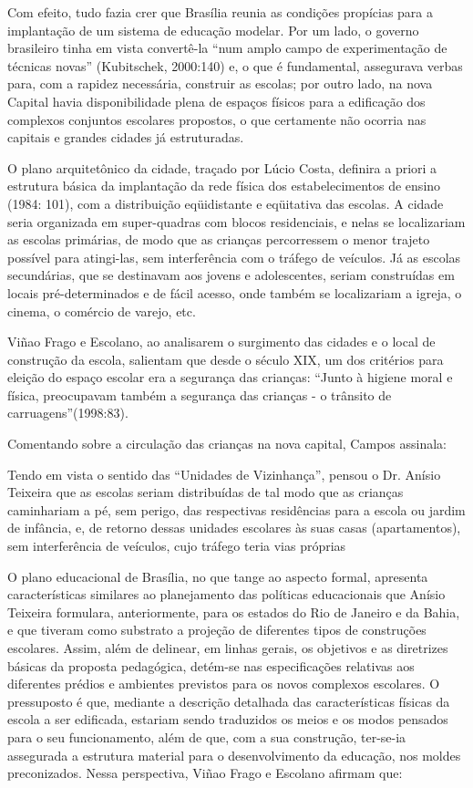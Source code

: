 Com efeito, tudo fazia crer que Brasília reunia as condições propícias para a
implantação de um sistema de educação modelar. Por um lado, o governo brasileiro
tinha em vista convertê-la “num amplo campo de experimentação de técnicas novas”
(Kubitschek, 2000:140) e, o que é fundamental, assegurava verbas para, com a rapidez
necessária, construir as escolas; por outro lado, na nova Capital havia disponibilidade
plena de espaços físicos para a edificação dos complexos conjuntos escolares propostos,
o que certamente não ocorria nas capitais e grandes cidades já estruturadas.

O plano arquitetônico da cidade, traçado por Lúcio Costa, definira a priori a
estrutura básica da implantação da rede física dos estabelecimentos de ensino (1984:
101), com a distribuição eqüidistante e eqüitativa das escolas. A cidade seria organizada
em super-quadras com blocos residenciais, e nelas se localizariam as escolas primárias,
de modo que as crianças percorressem o menor trajeto possível para atingi-las, sem
interferência com o tráfego de veículos. Já as escolas secundárias, que se destinavam
aos jovens e adolescentes, seriam construídas em locais pré-determinados e de fácil
acesso, onde também se localizariam a igreja, o cinema, o comércio de varejo, etc.

Viñao Frago e Escolano, ao analisarem o surgimento das cidades e o local de
construção da escola, salientam que desde o século XIX, um dos critérios para eleição
do espaço escolar era a segurança das crianças: “Junto à higiene moral e física,
preocupavam também a segurança das crianças - o trânsito de carruagens”(1998:83).

Comentando sobre a circulação das crianças na nova capital, Campos assinala:
\begin{citacao}
    Tendo em vista o sentido das “Unidades de Vizinhança”, pensou o Dr.
    Anísio Teixeira que as escolas seriam distribuídas de tal modo que as
    crianças caminhariam a pé, sem perigo, das respectivas residências para a
    escola ou jardim de infância, e, de retorno dessas unidades escolares às suas
    casas (apartamentos), sem interferência de veículos, cujo tráfego teria vias
    próprias
\end{citacao}

O plano educacional de Brasília, no que tange ao aspecto formal, apresenta
características similares ao planejamento das políticas educacionais que Anísio Teixeira
formulara, anteriormente, para os estados do Rio de Janeiro e da Bahia, e que tiveram
como substrato a projeção de diferentes tipos de construções escolares. Assim, além de
delinear, em linhas gerais, os objetivos e as diretrizes básicas da proposta pedagógica,
detém-se nas especificações relativas aos diferentes prédios e ambientes previstos para
os novos complexos escolares. O pressuposto é que, mediante a descrição detalhada das
características físicas da escola a ser edificada, estariam sendo traduzidos os meios e os
modos pensados para o seu funcionamento, além de que, com a sua construção, ter-se-ia
assegurada a estrutura material para o desenvolvimento da educação, nos moldes
preconizados. Nessa perspectiva, Viñao Frago e Escolano afirmam que:

